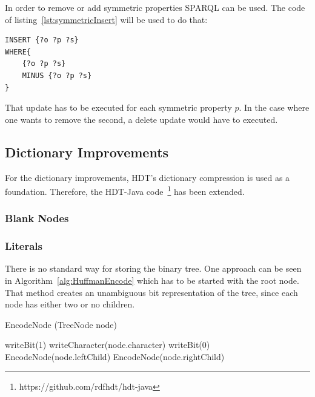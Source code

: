In order to remove or add symmetric properties SPARQL can be used. The code of listing~\ref{lst:symmetricInsert} will be used to do that:

\begin{lstlisting}[captionpos=b, caption=SPARQL query for adding triples with the symmetric property p, label=lst:symmetricInsert,
basicstyle=\ttfamily,frame=single]
INSERT {?o ?p ?s}
WHERE{
	{?o ?p ?s}
	MINUS {?o ?p ?s}
}
\end{lstlisting}

That update has to be executed for each symmetric property $p$. In the case where one wants to remove the second, a delete update would have to executed.

\subsection{Dictionary Improvements}\label{sec:implementationDictImprovements}

For the dictionary improvements, HDT's dictionary compression is used as a foundation. Therefore, the HDT-Java code~\footnote{https://github.com/rdfhdt/hdt-java} has been extended.

\subsubsection{Blank Nodes}\label{sec:implementationBlankNodes}

\subsubsection{Literals}\label{sec:implementationLiterals}

There is no standard way for storing the binary tree. One approach can be seen in Algorithm~\ref{alg:HuffmanEncode} which has to be started with the root node. That method creates an unambiguous bit representation of the tree, since each node has either two or no children.

\begin{algorithm}
	\caption{EncodeNode (TreeNode node)}\label{alg:HuffmanEncode}
	\begin{algorithmic}[1]
		\State writeBit(1)
		\State writeCharacter(node.character)
		\Else
		\State writeBit(0)
		\State EncodeNode(node.leftChild)
		\State EncodeNode(node.rightChild)
		\EndIf
	\end{algorithmic}
\end{algorithm}

